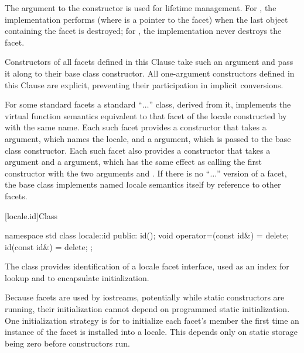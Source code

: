 \pnum
The  argument to the constructor is used for lifetime management.
For ,
the implementation performs 
(where  is a point\-er to the facet)
when the last  object containing the facet is destroyed;
for , the implementation never destroys the facet.

\pnum
Constructors of all facets defined in this Clause
take such an argument and pass it along to
their  base class constructor.
All one-argument constructors defined in this Clause are explicit,
preventing their participation in implicit conversions.

\pnum
For some standard facets a standard ``$\ldots$'' class,
derived from it, implements the virtual function semantics
equivalent to that facet of the locale
constructed by  with the same name.
Each such facet provides a constructor that takes
a  argument, which names the locale, and
a  argument, which is passed to the base class constructor.
Each such facet also provides a constructor that takes
a  argument  and
a  argument,
which has the same effect as calling the first constructor
with the two arguments  and .
If there is no ``$\ldots$'' version of a facet,
the base class implements named locale semantics itself
by reference to other facets.

[locale.id]{Class }

%
\begin{codeblock}
namespace std {
  class locale::id {
  public:
    id();
    void operator=(const id&) = delete;
    id(const id&) = delete;
  };
}
\end{codeblock}

\pnum
The class  provides
identification of a locale facet interface,
used as an index for lookup and to encapsulate initialization.

\pnum
\begin{note}
Because facets are used by iostreams,
potentially while static constructors are running,
their initialization cannot depend on programmed static initialization.
One initialization strategy is for 
to initialize each facet's  member
the first time an instance of the facet is installed into a locale.
This depends only on static storage being zero
before constructors run.
\end{note}

